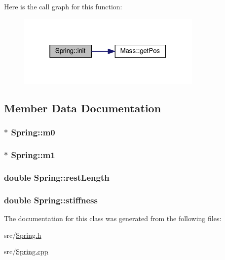 Here is the call graph for this function\+:\nopagebreak
\begin{figure}[H]
\begin{center}
\leavevmode
\includegraphics[width=256pt]{classSpring_a274a8d1cdb7de865bbf90ad6d95d789f_cgraph}
\end{center}
\end{figure}




\subsection{Member Data Documentation}
\hypertarget{classSpring_a59fda4f49a5645908643319198f4206f}{}
\subsubsection[{m0}]{$\ast$ Spring\+::m0\hspace{0.3cm}{\ttfamily [private]}}\label{classSpring_a59fda4f49a5645908643319198f4206f}
\hypertarget{classSpring_ac7909ea9cf093d7f267982a5ec3c51c6}{}
\subsubsection[{m1}]{ $\ast$ Spring\+::m1\hspace{0.3cm}{\ttfamily [private]}}\label{classSpring_ac7909ea9cf093d7f267982a5ec3c51c6}
\hypertarget{classSpring_ab2e2b4c400fcd277234b297f4f8cfd28}{}
\subsubsection[{rest\+Length}]{\setlength{\rightskip}{0pt plus 5cm}double Spring\+::rest\+Length}\label{classSpring_ab2e2b4c400fcd277234b297f4f8cfd28}
\hypertarget{classSpring_aed22a149191c40dcef27af3e029e60fd}{}
\subsubsection[{stiffness}]{\setlength{\rightskip}{0pt plus 5cm}double Spring\+::stiffness}\label{classSpring_aed22a149191c40dcef27af3e029e60fd}


The documentation for this class was generated from the following files\+:\begin{DoxyCompactItemize}
\item 
src/\hyperlink{Spring_8h}{Spring.\+h}\item 
src/\hyperlink{Spring_8cpp}{Spring.\+cpp}\end{DoxyCompactItemize}
